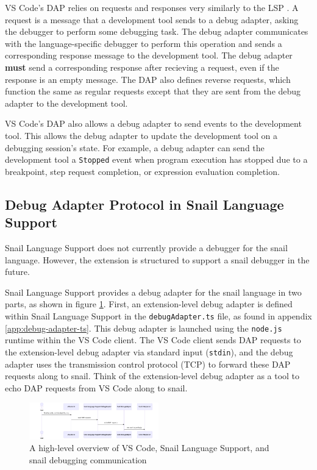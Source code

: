 \documentclass{article}
\begin{document}
VS Code's DAP relies on requests and responses very similarly to the LSP \cite{Microsoft_2021b}. A request is a message that a development tool sends to a debug adapter, asking the debugger to perform some debugging task. The debug adapter communicates with the language-specific debugger to perform this operation and sends a corresponding response message to the development tool. The debug adapter \textbf{must} send a corresponding response after recieving a request, even if the response is an empty message. The DAP also defines reverse requests, which function the same as regular requests except that they are sent from the debug adapter to the development tool.

VS Code's DAP also allows a debug adapter to send events to the development tool. This allows the debug adapter to update the development tool on a debugging session's state. For example, a debug adapter can send the development tool a \lstinline{Stopped} event when program execution has stopped due to a breakpoint, step request completion, or expression evaluation completion. 

\subsection{Debug Adapter Protocol in Snail Language Support}

Snail Language Support does not currently provide a debugger for the snail language. However, the extension is structured to support a snail debugger in the future. 

Snail Language Support provides a debug adapter for the snail language in two parts, as shown in figure \ref{fig:dap-high-level}. First, an extension-level debug adapter is defined within Snail Language Support in the \lstinline{debugAdapter.ts} file, as found in appendix \ref{app:debug-adapter-ts}. This debug adapter is launched using the \lstinline{node.js} runtime within the VS Code client. The VS Code client sends DAP requests to the extension-level debug adapter via standard input (\lstinline{stdin}), and the debug adapter uses the transmission control protocol (TCP) to forward these DAP requests along to snail. Think of the extension-level debug adapter as a tool to echo DAP requests from VS Code along to snail. 

\begin{figure}
    \begin{center}
        \includegraphics[width=0.5\textwidth]{png/dap-highlevel.png}
        \caption{
            \centering 
            A high-level overview of VS Code, Snail Language Support, and snail debugging communication
        }
        \label{fig:dap-high-level}
    \end{center}
\end{figure}
\end{document}
